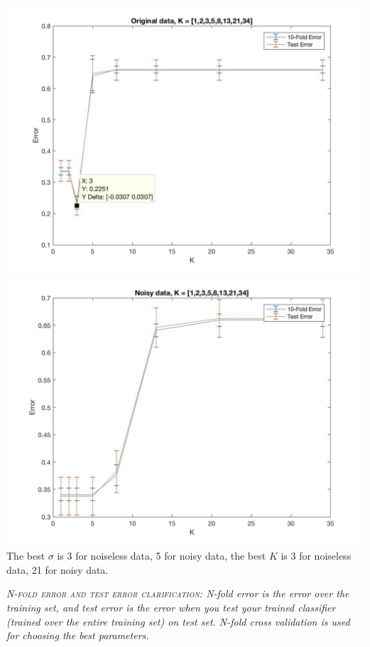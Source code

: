\documentclass[english]{article}
\begin{document}
\begin{itemize}
  {\tt  \includegraphics[width=1\textwidth]{original_KR_part2.jpg}}
 \\    
 
  {\tt  \includegraphics[width=1\textwidth]{noisy_KR_part2.jpg}}
 \\    
 
 The best $\sigma$ is  3  for noiseless data, 5 for noisy data, the best $K$ is 3 for noiseless data,  21 for noisy data.


\end{itemize}

\emph{\textsc{N-fold error and test error clarification:} N-fold error is the error over the training set, and test error is the error when you test your trained classifier (trained over the entire training set) on test set. N-fold cross validation is used for choosing the best parameters. }
\end{document}
